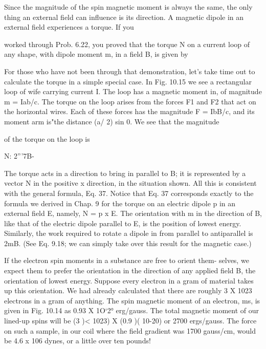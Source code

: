 {{Since the magnitude of the spin magnetic moment is always the
same, the only thing an external field can influence is its direction.
A magnetic dipole in an external field experiences a torque. If you

 

 

worked through Prob. 6.22, you proved that the torque N on a current
loop of any shape, with dipole moment m, in a field B, is given by

For those who have not been through that demonstration, let's take
time out to calculate the torque in a simple special case. In Fig. 10.15
we see a rectangular loop of wife carrying current I. The loop has
a magnetic moment in, of magnitude m = Iab/c. The torque on
the loop arises from the forces F1 and F2 that act on the horizontal
wires. Each of these forces has the magnitude F = IbB/c, and its
moment arm is"the distance (a/ 2) sin 0. We see that the magnitude

of the torque on the loop is

N: 2'''7B-%

The torque acts in a direction to bring in parallel to B; it is represented
by a vector N in the positive x direction, in the situation
shown. All this is consistent with the general formula, Eq. 37.
Notice that Eq. 37 corresponds exactly to the formula we derived
in Chap. 9 for the torque on an electric dipole p in an external field E,
namely, N = p x E. The orientation with m in the direction of B,
like that of the electric dipole parallel to E, is the position of lowest
energy. Similarly, the work required to rotate a dipole in from parallel
to antiparallel is 2mB. (See Eq. 9.18; we can simply take over
this result for the magnetic case.)

If the electron spin moments in a substance are free to orient them-
selves, we expect them to prefer the orientation in the direction of
any applied field B, the orientation of lowest energy. Suppose every
electron in a gram of material takes up this orientation. We had
already calculated that there are roughly 3 X 1023 electrons in a gram
of anything. The spin magnetic moment of an electron, ms, is given
in Fig. 10.14 as 0.93 X 1O‘2° erg/gauss. The total magnetic moment
of our lined-up spins will be (3 )< 1023) X (0.9 )( 10-20) or 2700
ergs/gauss. The force on such a sample, in our coil where the field
gradient was 1700 gauss/cm, would be 4.6 x 106 dynes, or a little
over ten pounds!

}}
